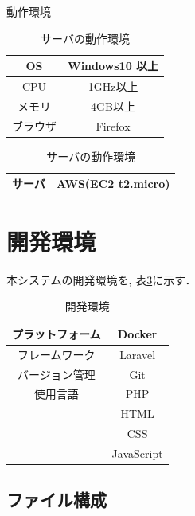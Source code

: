 \documentclass[a4paper, titlepage]{jsarticle}
\begin{document}
\begin{table}[H]
  \begin{minipage}{0.45\linewidth}
    \centering
    \caption{動作環境}
    \label{tab:OpEnv}
    \begin{tabular}{c|c} \hline
      OS & Windows10 以上 \\ \hline
      CPU & 1GHz以上 \\ \hline
      メモリ & 4GB以上 \\ \hline
      ブラウザ & Firefox \\ \hline
    \end{tabular}
  \end{minipage}
  \begin{minipage}{0.45\linewidth}
    \centering
    \caption{サーバの動作環境}
    \label{tab:ServerEnv}
    \begin{tabular}{c|c} \hline
      サーバ & AWS(EC2 t2.micro) \\ \hline
    \end{tabular}
  \end{minipage}
\end{table}

\section{開発環境}
本システムの開発環境を, 表\ref{tab:DevEnv}に示す．
\begin{table}[H]
  \centering
  \caption{開発環境}
  \label{tab:DevEnv}
  \begin{tabular}{c|c} \hline
    プラットフォーム & Docker \\ \hline
    フレームワーク & Laravel \\ \hline
    バージョン管理 & Git \\ \hline
    使用言語 & PHP \\
    & HTML \\
    & CSS \\
    & JavaScript \\ \hline
  \end{tabular}
\end{table}

\subsection{ファイル構成}
\end{document}
